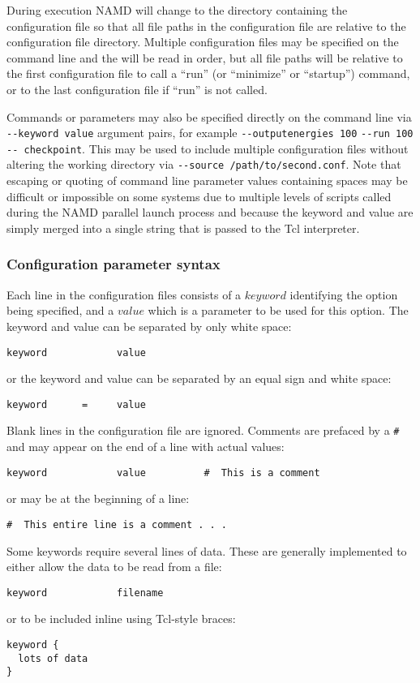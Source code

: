 During execution NAMD will change to the directory containing the
configuration file so that all file paths in the configuration file
are relative to the configuration file directory.
Multiple configuration files may be specified on the command line
and the will be read in order, but all file paths will be relative
to the first configuration file to call a ``run'' (or ``minimize'' or ``startup'') command, or
to the last configuration file if ``run'' is not called.

Commands or parameters may also be specified directly on the
command line via \verb#--keyword value# argument pairs, for example
\verb#--outputenergies 100# \verb#--run 100# \verb#-- checkpoint#.
This may be used to include multiple configuration files without altering the
working directory via \verb#--source /path/to/second.conf#.
Note that escaping or quoting of command line parameter values
containing spaces may be difficult or impossible on some systems due
to multiple levels of scripts called during the NAMD parallel launch process
and because the keyword and value are simply merged into a single string
that is passed to the Tcl interpreter.

\subsubsection{Configuration parameter syntax}
\label{section:configsyntax}
Each line
in the configuration files consists of a $keyword$ identifying the option
being specified, and a $value$ which is a parameter to be used for this
option.  The keyword and value can be separated by only white space:
\begin{verbatim}
keyword            value
\end{verbatim}
or the keyword and value can be separated by an equal sign and white space:
\begin{verbatim}
keyword      =     value
\end{verbatim}
Blank lines in the configuration file are ignored.  Comments are prefaced by
a \verb!#! and may appear on the end of a line with actual values:
\begin{verbatim}
keyword            value          #  This is a comment
\end{verbatim}
or may be at the beginning of a line:
\begin{verbatim}
#  This entire line is a comment . . . 
\end{verbatim}
Some keywords require several lines of data.
These are generally implemented to either allow the data to be read from a file:
\begin{verbatim}
keyword            filename
\end{verbatim}
or to be included inline using Tcl-style braces:
\begin{verbatim}
keyword {
  lots of data
}
\end{verbatim}

